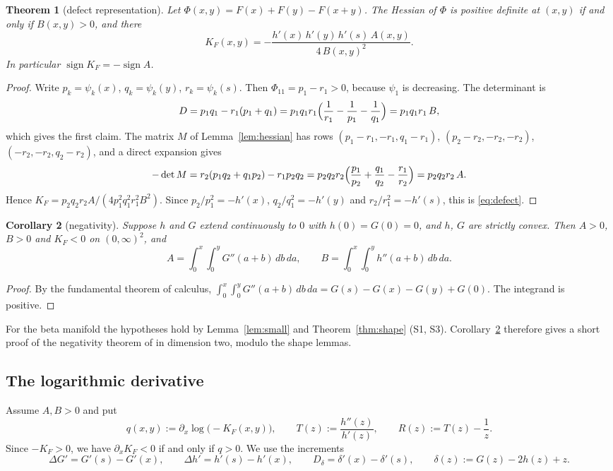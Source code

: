 \documentclass[11pt,a4paper]{article}
\newtheorem{theorem}{Theorem}[section]
\newtheorem{corollary}[theorem]{Corollary}
\theoremstyle{definition}
\theoremstyle{remark}
\newcommand{\Dd}{D_\delta}
\begin{document}
\begin{theorem}[defect representation]\label{thm:defect}
Let $\Phi(x,y)=F(x)+F(y)-F(x+y)$. The Hessian of $\Phi$ is positive definite at $(x,y)$ if and only if $B(x,y)>0$, and there
\begin{equation}\label{eq:defect}
K_F(x,y)=-\frac{h'(x)\,h'(y)\,h'(s)\,A(x,y)}{4\,B(x,y)^2}.
\end{equation}
In particular $\operatorname{sign}K_F=-\operatorname{sign}A$.
\end{theorem}

\begin{proof}
Write $p_k=\psi_k(x)$, $q_k=\psi_k(y)$, $r_k=\psi_k(s)$. Then $\Phi_{11}=p_1-r_1>0$, because $\psi_1$ is decreasing. The determinant is
\[
D=p_1q_1-r_1(p_1+q_1)=p_1q_1r_1\Bigl(\frac1{r_1}-\frac1{p_1}-\frac1{q_1}\Bigr)=p_1q_1r_1\,B,
\]
which gives the first claim. The matrix $M$ of Lemma~\ref{lem:hessian} has rows $(p_1-r_1,-r_1,q_1-r_1)$, $(p_2-r_2,-r_2,-r_2)$, $(-r_2,-r_2,q_2-r_2)$, and a direct expansion gives
\[
-\det M=r_2(p_1q_2+q_1p_2)-r_1p_2q_2=p_2q_2r_2\Bigl(\frac{p_1}{p_2}+\frac{q_1}{q_2}-\frac{r_1}{r_2}\Bigr)=p_2q_2r_2\,A .
\]
Hence $K_F=p_2q_2r_2A/(4p_1^2q_1^2r_1^2B^2)$. Since $p_2/p_1^2=-h'(x)$, $q_2/q_1^2=-h'(y)$ and $r_2/r_1^2=-h'(s)$, this is \eqref{eq:defect}.
\end{proof}

\begin{corollary}[negativity]\label{cor:neg}
Suppose $h$ and $G$ extend continuously to $0$ with $h(0)=G(0)=0$, and $h$, $G$ are strictly convex. Then $A>0$, $B>0$ and $K_F<0$ on $(0,\infty)^2$, and
\begin{equation}\label{eq:double}
A=\int_0^x\!\!\int_0^y G''(a+b)\,db\,da,\qquad B=\int_0^x\!\!\int_0^y h''(a+b)\,db\,da .
\end{equation}
\end{corollary}
\begin{proof}
By the fundamental theorem of calculus, $\int_0^x\int_0^yG''(a+b)\,db\,da=G(s)-G(x)-G(y)+G(0)$. The integrand is positive.
\end{proof}

For the beta manifold the hypotheses hold by Lemma~\ref{lem:small} and Theorem~\ref{thm:shape} (S1, S3). Corollary~\ref{cor:neg} therefore gives a short proof of the negativity theorem of \cite{LBP19,LBPP21} in dimension two, modulo the shape lemmas.

\subsection{The logarithmic derivative}
Assume $A,B>0$ and put
\[
q(x,y):=\partial_x\log\bigl(-K_F(x,y)\bigr),\qquad T(z):=\frac{h''(z)}{h'(z)},\qquad R(z):=T(z)-\frac1z .
\]
Since $-K_F>0$, we have $\partial_xK_F<0$ if and only if $q>0$. We use the increments
\[
\Delta G'=G'(s)-G'(x),\qquad \Delta h'=h'(s)-h'(x),\qquad \Dd=\delta'(x)-\delta'(s),\qquad \delta(z):=G(z)-2h(z)+z .
\]
\end{document}
